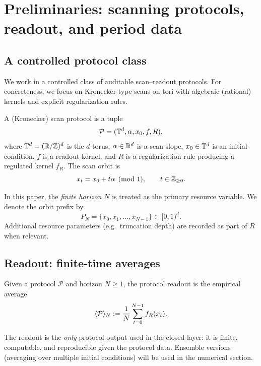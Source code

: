 
\section{Preliminaries: scanning protocols, readout, and period data}
\label{sec:preliminaries}

\subsection{A controlled protocol class}
\label{sec:prelim_scanalg}

We work in a controlled class of auditable scan--readout protocols.
For concreteness, we focus on Kronecker-type scans on tori with algebraic (rational) kernels and explicit regularization rules.

\begin{definition}
\label{def:protocol}
A (Kronecker) scan protocol is a tuple
\[
\mathcal{P}=(\mathbb{T}^d,\alpha,x_0,f,R),
\]
where $\mathbb{T}^d=(\mathbb{R}/\mathbb{Z})^d$ is the $d$-torus, $\alpha\in\mathbb{R}^d$ is a scan slope, $x_0\in\mathbb{T}^d$ is an initial condition, $f$ is a readout kernel, and $R$ is a regularization rule producing a regulated kernel $f_R$.
The scan orbit is
\[
x_t = x_0+t\alpha \pmod 1,\qquad t\in\mathbb{Z}_{\ge 0}.
\]
\end{definition}

In this paper, the \emph{finite horizon} $N$ is treated as the primary resource variable.
We denote the orbit prefix by
\[
P_N=\{x_0,x_1,\dots,x_{N-1}\}\subset [0,1)^d.
\]
Additional resource parameters (e.g.\ truncation depth) are recorded as part of $R$ when relevant.

\subsection{Readout: finite-time averages}
\label{sec:prelim_readout}

\begin{definition}
\label{def:readout}
Given a protocol $\mathcal{P}$ and horizon $N\ge 1$, the protocol readout is the empirical average
\[
\langle \mathcal{P} \rangle_N := \frac{1}{N}\sum_{t=0}^{N-1} f_R(x_t).
\]
\end{definition}

The readout is the \emph{only} protocol output used in the closed layer: it is finite, computable, and reproducible given the protocol data.
Ensemble versions (averaging over multiple initial conditions) will be used in the numerical section.

